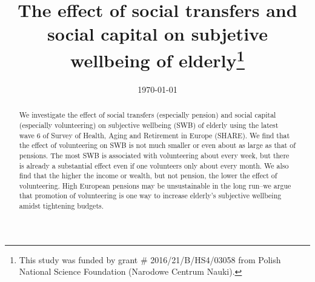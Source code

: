 \documentclass[10pt, letterpaper]{article}
\date{{}\today}
\title{  
The effect of social transfers and social capital on subjetive wellbeing of
elderly\footnote{This study was funded by grant \# 2016/21/B/HS4/03058 from
  Polish National Science Foundation (Narodowe Centrum Nauki).}
}
\author{
}
\begin{document}


\maketitle
\vspace{-.4in}
\begin{center}

\end{center}


\begin{abstract}
\noindent We investigate the effect of social transfers (especially pension) and
social capital (especially volunteering) on subjective wellbeing (SWB) of
elderly using the latest wave 6 of Survey of Health, Aging and Retirement in Europe
(SHARE). We find that the effect of volunteering on SWB is not much smaller or
even about as large as that of pensions. The most SWB is associated with volunteering about
every week, but there is already a substantial effect even if one volunteers only
about every month. 
We also find that the higher the income or wealth, but not pension, the lower
the effect of volunteering.  
High European pensions may be unsustainable in the long run--we argue that
 promotion of volunteering is one way to increase elderly's subjective wellbeing amidst tightening budgets.
\end{abstract}
\vspace{.15in} 
\vspace{.25in} 
\end{document}
